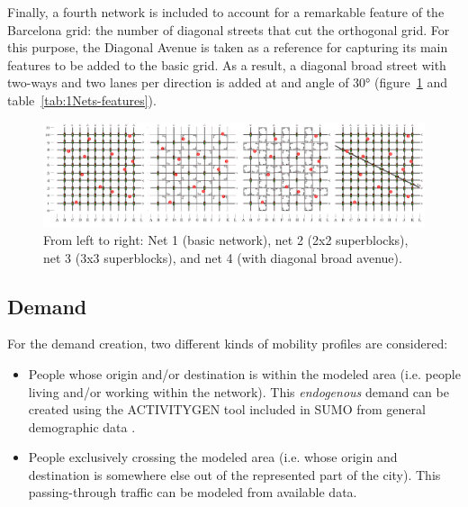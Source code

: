 \documentclass[11pt]{article}
\begin{document}
Finally, a fourth network is included to account for a remarkable feature of the Barcelona grid: the number of diagonal streets that cut the orthogonal grid. For this purpose, the Diagonal Avenue is taken as a reference for capturing its main features to be added to the basic grid. As a result, a diagonal broad street with two-ways and two lanes per direction is added at and angle of 30° (figure~\ref{fig:4nets} and table~\ref{tab:1Nets-features}).

\begin{figure}[htbp]
\centering
\includegraphics[width=\textwidth]{bcn_paradox_4nets.PNG}
\caption{From left to right: Net 1 (basic network), net 2 (2x2 superblocks), net 3 (3x3 superblocks), and net 4 (with diagonal broad avenue).}
\label{fig:4nets}
\end{figure}


\begin{table}[htbp]
\centering
\caption{Main metrics for each network.}
\label{tab:1Nets-features}
\end{table}

\subsection {Demand}

For the demand creation, two different kinds of mobility profiles are considered:
\begin{itemize}
\setlength\itemsep{0.05em}
    \item People whose origin and/or destination is within the modeled area (i.e. people living and/or working within the network). This \textit{endogenous} demand can be created using the ACTIVITYGEN tool included in SUMO from general demographic data \citep{Lopez2018}.
    \item People exclusively crossing the modeled area (i.e. whose origin and destination is somewhere else out of the represented part of the city). This passing-through traffic can be modeled from available data.
\end{itemize}
\end{document}
